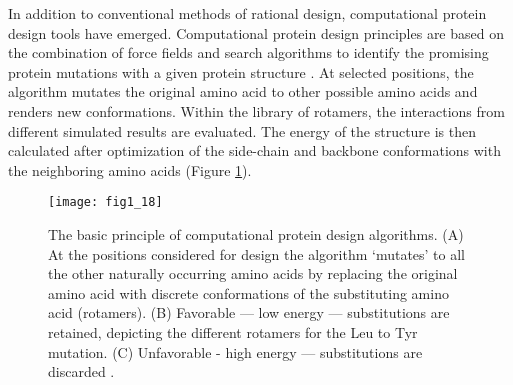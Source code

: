 \begin{refsection}
In addition to conventional methods of rational design, computational
protein design tools have emerged. Computational protein design principles
are based on the combination of force fields and search algorithms to
identify the promising protein mutations with a given protein structure
\cite{VanDerSloot2009a}. At selected positions, the algorithm mutates the
original amino acid to other possible amino acids and renders new conformations.
Within the library of rotamers, the interactions from different simulated
results are evaluated. The energy of the structure is then calculated
after optimization of the side-chain and backbone conformations with the
neighboring amino acids \cite{VanDerSloot2009a} (Figure \ref{fig:cpd}).
\begin{figure}[htbp] \centering \texttt{[image: fig1\_18]}
    \caption[The basic principle of computational protein design algorithms.
        (A) At the positions considered for design the algorithm ‘mutates’ to
        all the other naturally occurring amino acids by replacing the original
        amino acid with discrete conformations of the substituting amino acid
        (rotamers). (B) Favorable — low energy — substitutions are retained,
        depicting the different rotamers for the Leu to Tyr mutation. (C)
    Unfavorable - high energy — substitutions are discarded.]{The basic
        principle of computational protein design algorithms. (A) At the
        positions considered for design the algorithm ‘mutates’ to all the
        other naturally occurring amino acids by replacing the original amino
        acid with discrete conformations of the substituting amino acid
        (rotamers). (B) Favorable — low energy — substitutions are retained,
        depicting the different rotamers for the Leu to Tyr mutation. (C)
        Unfavorable - high energy — substitutions are discarded
        \cite{VanDerSloot2009a}.} 
    \label{fig:cpd} 
\end{figure}


\end{refsection}
